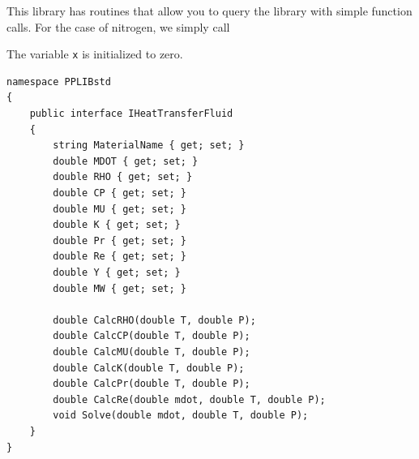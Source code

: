 \documentclass[letterpaper,twocolumn]{article}  %
\begin{document}
	This library has routines that allow you to query the library with simple function calls. For the case of nitrogen, we simply call 
	
	The variable \lstinline|x| is initialized to zero.
\begin{lstlisting}[language={[Sharp]C}]
namespace PPLIBstd
{
	public interface IHeatTransferFluid
	{
		string MaterialName { get; set; }
		double MDOT { get; set; }
		double RHO { get; set; }
		double CP { get; set; }
		double MU { get; set; }
		double K { get; set; }
		double Pr { get; set; }
		double Re { get; set; }
		double Y { get; set; }
		double MW { get; set; }
		
		double CalcRHO(double T, double P);
		double CalcCP(double T, double P);
		double CalcMU(double T, double P);
		double CalcK(double T, double P);
		double CalcPr(double T, double P);
		double CalcRe(double mdot, double T, double P);
		void Solve(double mdot, double T, double P);
	}
}

\end{lstlisting}

	
	
\end{document}
